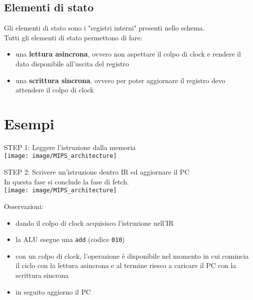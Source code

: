 \documentclass[../main.tex]{subfiles}
\begin{document}
    \subsection{Elementi di stato}
    Gli elementi di stato sono i "registri interni" presenti nello schema.
    \\[3mm]
    Tutti gli elementi di stato permettono di fare:
    \begin{itemize}
        \item una \textbf{lettura asincrona}, ovvero non aspettare il colpo
        di clock e rendere il dato disponibile all'uscita del registro
        \item una \textbf{scrittura sincrona}, ovvero per poter aggiornare
        il registro devo attendere il colpo di clock
    \end{itemize}

    \newpage

    \section*{Esempi}
    STEP 1: Leggere l'istruzione dalla memoria \\

    \vspace*{5mm}
    \texttt{[image: image/MIPS\_architecture]}
    \vspace*{5mm}

    \noindent
    STEP 2: Scrivere un'istruzione dentro IR ed aggiornare il PC \\
    In questa fase si conclude la fase di fetch. \\

    \vspace*{5mm}
    \texttt{[image: image/MIPS\_architecture]}
    \vspace*{5mm}

    \noindent
    Osservazioni:
    \begin{itemize}
        \item dando il colpo di clock acquisisco l'istruzione nell'IR
        \item la ALU esegue una \texttt{add} (codice \texttt{010})
        \item con un colpo di clock, l'operazione è disponibile nel momento
        in cui comincia il ciclo con la lettura asincrona e al termine riesco
        a caricare il PC con la scrittura sincrona
        \item in seguito aggiorno il PC
    \end{itemize}
\end{document}
